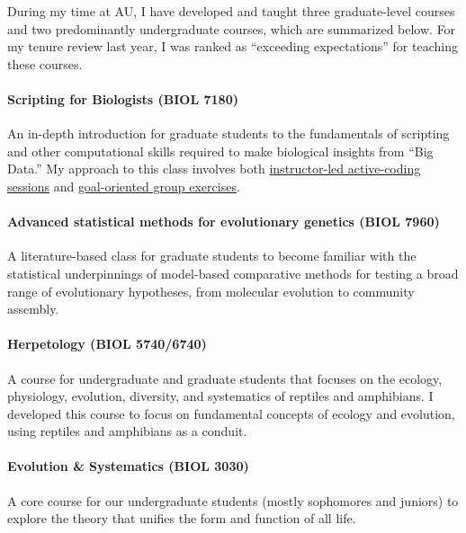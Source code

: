 During my time at AU,
I have developed and taught three graduate-level courses
and two predominantly undergraduate courses,
which are summarized below.
For my tenure review last year, I was ranked as ``exceeding
expectations'' for teaching these courses.

\paragraph*{Scripting for Biologists (BIOL 7180)}
An in-depth introduction for graduate students to the fundamentals of scripting
and other computational skills required to make biological insights from ``Big
Data.''
My approach to this class involves both
\href{http://phyletica.org/slides/python/intro/}{instructor-led active-coding
    sessions}
and
\href{https://github.com/joaks1/python-translation-project}{goal-oriented group
    exercises}.

\paragraph*{Advanced statistical methods for evolutionary genetics (BIOL 7960)}
A literature-based class for graduate students to become familiar with the
statistical underpinnings of model-based comparative methods for testing a
broad range of evolutionary hypotheses, from molecular evolution to community
assembly.

\paragraph*{Herpetology (BIOL 5740/6740)}
A course for undergraduate and graduate students that focuses on the ecology,
physiology, evolution, diversity, and systematics of reptiles and amphibians.
I developed this course to focus on fundamental concepts of ecology and
evolution, using reptiles and amphibians as a conduit.

\paragraph*{Evolution \& Systematics (BIOL 3030)}
A core course for our undergraduate students (mostly sophomores and juniors) to
explore the theory that unifies the form and function of all life.


